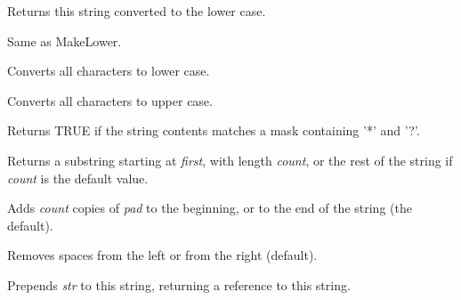 
Returns this string converted to the lower case.

\label{wxstringlowercase}


Same as MakeLower.

\label{wxstringmakelower}


Converts all characters to lower case.

\label{wxstringmakeupper}


Converts all characters to upper case.

\label{wxstringmatches}


Returns TRUE if the string contents matches a mask containing '*' and '?'.

\label{wxstringmid}


Returns a substring starting at {\it first}, with length {\it count}, or the rest of
the string if {\it count} is the default value.

\label{wxstringpad}


Adds {\it count} copies of {\it pad} to the beginning, or to the end of the string (the default).

Removes spaces from the left or from the right (default).

\label{wxstringprepend}


Prepends {\it str} to this string, returning a reference to this string.

\label{wxstringprintf}


